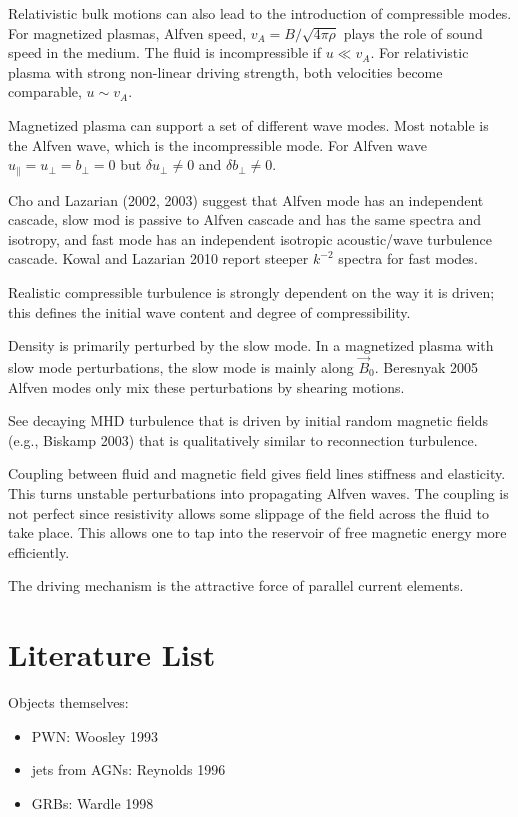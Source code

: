 \documentclass[usenatbib,twocolumn, twocolappendix]{aastex63}
\begin{document}
\begin{appendix}
Relativistic bulk motions can also lead to the introduction of compressible modes.
For magnetized plasmas, Alfven speed, $v_A = B/\sqrt{4\pi\rho}$ plays the role of sound speed in the medium.
The fluid is incompressible if $u \ll v_A$.
For relativistic plasma with strong non-linear driving strength, both velocities become comparable, $u \sim v_A$.


Magnetized plasma can support a set of different wave modes.
Most notable is the Alfven wave, which is the incompressible mode.
For Alfven wave $u_\parallel = u_\perp = b_\perp = 0$ but $\delta u_\perp \ne 0$ and $\delta b_\perp \ne 0$.


Cho and Lazarian (2002, 2003) suggest that Alfven mode has an independent cascade, slow mod is passive to Alfven cascade and has the same spectra and isotropy, and fast mode has an independent isotropic acoustic/wave turbulence cascade.
Kowal and Lazarian 2010 report steeper $k^{-2}$ spectra for fast modes.

Realistic compressible turbulence is strongly dependent on the way it is driven;
this defines the initial wave content and degree of compressibility.

Density is primarily perturbed by the slow mode.
In a magnetized plasma with slow mode perturbations, the slow mode is mainly along $\vec{B}_0$.
Beresnyak 2005
Alfven modes only mix these perturbations by shearing motions.

See decaying MHD turbulence that is driven by initial random magnetic fields (e.g., Biskamp 2003) that is qualitatively similar to reconnection turbulence.


Coupling between fluid and magnetic field gives field lines stiffness and elasticity.
This turns unstable perturbations into propagating Alfven waves.
The coupling is not perfect since resistivity allows some slippage of the field across the fluid to take place.
This allows one to tap into the reservoir of free magnetic energy more efficiently.

The driving mechanism is the attractive force of parallel current elements.




\section{Literature List }\label{sect:literature}

Objects themselves:
\begin{itemize}
    \item PWN: Woosley 1993
    \item jets from AGNs: Reynolds 1996
    \item GRBs: Wardle 1998
\end{itemize}


\end{appendix}
\end{document}
